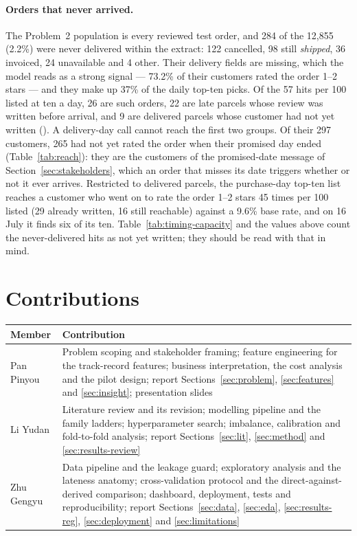 \paragraph{Orders that never arrived.} The Problem~2 population is every reviewed
test order, and 284 of the 12{,}855 (2.2\%) were never delivered within the
extract: 122 cancelled, 98 still \emph{shipped}, 36 invoiced, 24 unavailable and
4 other. Their delivery fields are missing, which the model reads as a strong
signal --- 73.2\% of their customers rated the order 1--2 stars --- and they make
up 37\% of the daily top-ten picks. Of the 57 hits per 100 listed at ten a day,
26 are such orders, 22 are late parcels whose review was written before arrival,
and 9 are delivered parcels whose customer had not yet written
(). A delivery-day call cannot reach the
first two groups. Of their 297 customers, 265 had not yet rated the order when
their promised day ended (Table~\ref{tab:reach}): they are the customers of the
promised-date message of Section~\ref{sec:stakeholders}, which an order that
misses its date triggers whether or not it ever arrives. Restricted to delivered parcels, the purchase-day
top-ten list reaches a customer who went on to rate the order 1--2 stars 45 times
per 100 listed (29 already written, 16 still reachable) against a 9.6\% base
rate, and on 16 July it finds six of its ten. Table~\ref{tab:timing-capacity} and
the values above count the never-delivered hits as not yet written; they should
be read with that in mind.

\section{Contributions}
\label{app:contributions}

\begin{center}
\small
\begin{tabular}{@{}lp{11.2cm}@{}}
\toprule
\textbf{Member} & \textbf{Contribution} \\
\midrule
Pan Pinyou & Problem scoping and stakeholder framing; feature engineering for the
track-record features; business interpretation, the cost analysis and the pilot
design; report Sections~\ref{sec:problem}, \ref{sec:features} and
\ref{sec:insight}; presentation slides \\[3pt]
Li Yudan & Literature review and its revision; modelling pipeline and the family
ladders; hyperparameter search; imbalance, calibration and fold-to-fold
analysis; report Sections~\ref{sec:lit}, \ref{sec:method} and
\ref{sec:results-review} \\[3pt]
Zhu Gengyu & Data pipeline and the leakage guard; exploratory analysis and the
lateness anatomy; cross-validation protocol and the direct-against-derived
comparison; dashboard, deployment, tests and reproducibility; report
Sections~\ref{sec:data}, \ref{sec:eda}, \ref{sec:results-reg},
\ref{sec:deployment} and \ref{sec:limitations} \\
\bottomrule
\end{tabular}
\end{center}


